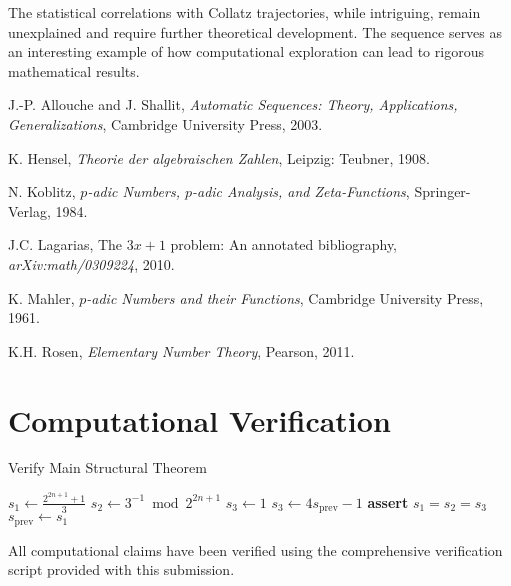 \documentclass[11pt]{article}
\theoremstyle{definition}
\begin{document}
The statistical correlations with Collatz trajectories, while intriguing, remain unexplained and require further theoretical development. The sequence serves as an interesting example of how computational exploration can lead to rigorous mathematical results.

\begin{thebibliography}{9}
J.-P. Allouche and J. Shallit, \emph{Automatic Sequences: Theory, Applications, Generalizations}, Cambridge University Press, 2003.

K. Hensel, \emph{Theorie der algebraischen Zahlen}, Leipzig: Teubner, 1908.

N. Koblitz, \emph{$p$-adic Numbers, $p$-adic Analysis, and Zeta-Functions}, Springer-Verlag, 1984.

J.C. Lagarias, The $3x+1$ problem: An annotated bibliography, \emph{arXiv:math/0309224}, 2010.

K. Mahler, \emph{$p$-adic Numbers and their Functions}, Cambridge University Press, 1961.

K.H. Rosen, \emph{Elementary Number Theory}, Pearson, 2011.
\end{thebibliography}

\appendix

\section{Computational Verification}

\begin{algorithm}
\caption{Verify Main Structural Theorem}
\begin{algorithmic}[1]
    \STATE $s_1 \leftarrow \frac{2^{2n+1} + 1}{3}$
    \STATE $s_2 \leftarrow 3^{-1} \bmod 2^{2n+1}$
        \STATE $s_3 \leftarrow 1$
    \ELSE
        \STATE $s_3 \leftarrow 4s_{\text{prev}} - 1$
    \ENDIF
    \STATE \textbf{assert} $s_1 = s_2 = s_3$
    \STATE $s_{\text{prev}} \leftarrow s_1$
\ENDFOR
\end{algorithmic}
\end{algorithm}

All computational claims have been verified using the comprehensive verification script provided with this submission.
\end{document}
